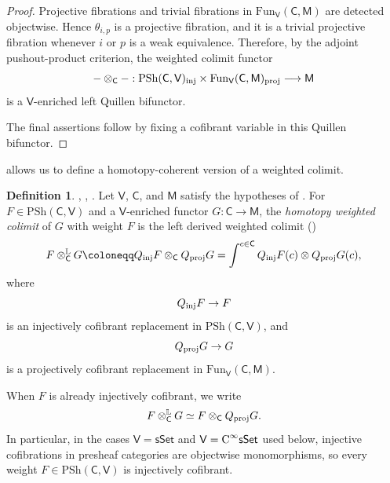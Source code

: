\documentclass{amsart}
\newcommand{\cat}[1]{\mathsf{#1}}
\newcommand{\sset}{\cat{sSet}}
\newcommand{\proj}{\textnormal{proj}}
\newcommand{\inj}{\textnormal{inj}}
\newcommand{\CsSet}{\textnormal{C}^{\infty}\sset}
\newcommand{\Fun}{\mathrm{Fun}}
\newcommand{\psh}{\mathrm{PSh}}
\theoremstyle{definition}
\newtheorem{definition}[equation]{Definition}
\numberwithin{equation}{subsection}
\numberwithin{subsubsection}{subsection}
\begin{document}
\begin{proof}
  Projective fibrations and trivial fibrations in
  \(\Fun_{\cat{V}}(\cat{C},\cat{M})\) are detected objectwise. Hence
  \(\theta_{i,p}\) is a projective fibration, and it is a trivial
  projective fibration whenever \(i\) or \(p\) is a weak
  equivalence. Therefore, by the adjoint
  pushout-product criterion, the weighted colimit functor
  \[
    -\otimes_{\cat{C}}-:
    \psh(\cat{C},\cat{V})_{\inj}
    \times
    \Fun_{\cat{V}}(\cat{C},\cat{M})_{\proj}
    \longrightarrow
    \cat{M}
  \]
  is a \(\cat{V}\)-enriched left Quillen bifunctor.

  The final assertions follow by fixing a cofibrant variable in this
  Quillen bifunctor.
\end{proof}

 allows us to define a
homotopy-coherent version of a weighted colimit.

\begin{definition}\label{def:homotopy.weighted.colimit}
  \textnormal{\cite[Chapter~XII, Section 2]{BK72}},
  \textnormal{\cite[Definition 13.2]{Shu06}},
  \textnormal{\cite[Definition~19.1.2]{Hir03}}.
  Let \(\cat{V}\), \(\cat{C}\), and \(\cat{M}\) satisfy the hypotheses of
  . For
  \(F\in \psh(\cat{C},\cat{V})\) and a \(\cat{V}\)-enriched functor
  \(G:\cat{C}\to \cat{M}\), the \emph{homotopy weighted colimit} of
  \(G\) with weight \(F\) is the left derived weighted colimit
  ()
  \[
    F\otimes^{\mathbb{L}}_{\cat{C}}G
    \coloneqq
    Q_{\inj}F\otimes_{\cat{C}} Q_{\proj}G
    =
    \int^{c\in \cat{C}}
    Q_{\inj}F(c)\otimes Q_{\proj}G(c),
  \]
  where
  \[
    Q_{\inj}F\to F
  \]
  is an injectively cofibrant replacement in
  \( \psh(\cat{C},\cat{V}) \), and
  \[
    Q_{\proj}G\to G
  \]
  is a projectively cofibrant replacement in
  \( \Fun_{\cat{V}}(\cat{C},\cat{M}) \).

  When \(F\) is already injectively cofibrant, we write
  \[
    F\otimes^{\mathbb{L}}_{\cat{C}}G
    \simeq
    F\otimes_{\cat{C}} Q_{\proj}G.
  \]
  In particular, in the cases \(\cat{V}=\sset\) and \(\cat{V}=\CsSet\)
  used below, injective cofibrations in presheaf categories are objectwise
  monomorphisms, so every weight \(F\in\psh(\cat{C},\cat{V})\) is
  injectively cofibrant.
\end{definition}
\end{document}
